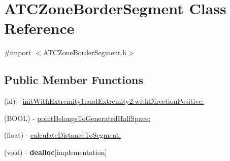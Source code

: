 \hypertarget{interface_a_t_c_zone_border_segment}{
\section{\-A\-T\-C\-Zone\-Border\-Segment \-Class \-Reference}
\label{interface_a_t_c_zone_border_segment}
}


{\ttfamily \#import $<$\-A\-T\-C\-Zone\-Border\-Segment.\-h$>$}

\subsection*{\-Public \-Member \-Functions}
\begin{DoxyCompactItemize}
\item 
(id) -\/ \hyperlink{interface_a_t_c_zone_border_segment_a6f0d9be3a9ea9cde7b24075629b93613}{init\-With\-Extremity1\-:and\-Extremity2\-:with\-Direction\-Positive\-:}
\item 
(\-B\-O\-O\-L) -\/ \hyperlink{interface_a_t_c_zone_border_segment_a6ff901b513d84a61d1b508de90d51d3e}{point\-Belongs\-To\-Generated\-Half\-Space\-:}
\item 
(float) -\/ \hyperlink{interface_a_t_c_zone_border_segment_a4bc8f6402aaaee12d903857c2c72f0c4}{calculate\-Distance\-To\-Segment\-:}
\item 
\hypertarget{interface_a_t_c_zone_border_segment_a9b150de986c9ec6159d9552ff5ebcee9}{
(void) -\/ {\bfseries dealloc}{\ttfamily  \mbox{[}implementation\mbox{]}}}
\label{interface_a_t_c_zone_border_segment_a9b150de986c9ec6159d9552ff5ebcee9}

\end{DoxyCompactItemize}

